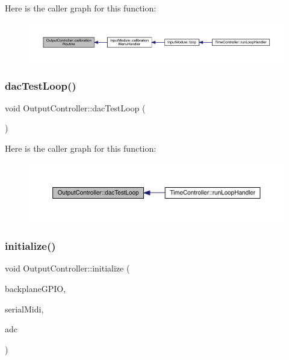 Here is the caller graph for this function\+:
\nopagebreak
\begin{figure}[H]
\begin{center}
\leavevmode
\includegraphics[width=350pt]{class_output_controller_a08b99c2f97e05cebeab1cbc9f680d8a9_icgraph}
\end{center}
\end{figure}
\mbox{\label{class_output_controller_a858a11f23ccf69f351cefbb5b7cca8eb}} 
\subsubsection{\texorpdfstring{dac\+Test\+Loop()}{dacTestLoop()}}
{\footnotesize\ttfamily void Output\+Controller\+::dac\+Test\+Loop (\begin{DoxyParamCaption}{ }\end{DoxyParamCaption})}

Here is the caller graph for this function\+:
\nopagebreak
\begin{figure}[H]
\begin{center}
\leavevmode
\includegraphics[width=350pt]{class_output_controller_a858a11f23ccf69f351cefbb5b7cca8eb_icgraph}
\end{center}
\end{figure}
\mbox{\label{class_output_controller_a6c7741fe241177b6c0d1236df4c9d358}} 
\subsubsection{\texorpdfstring{initialize()}{initialize()}}
{\footnotesize\ttfamily void Output\+Controller\+::initialize (\begin{DoxyParamCaption}\item[{Zetaohm\+\_\+\+M\+A\+X7301 $\ast$}]{backplane\+G\+P\+IO,  }\item[{midi\+::\+Midi\+Interface$<$ Hardware\+Serial $>$ $\ast$}]{serial\+Midi,  }\item[{A\+DC $\ast$}]{adc }\end{DoxyParamCaption})}

